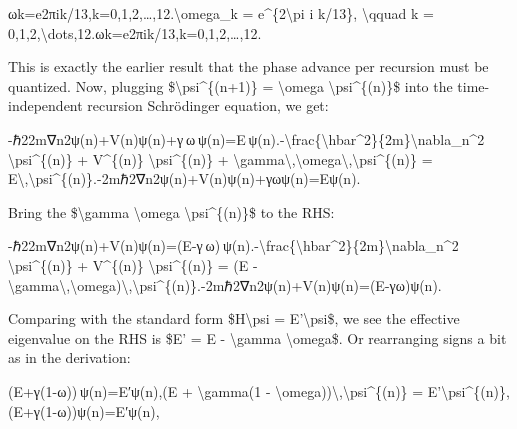 \documentclass[
]{article}
\begin{document}
ωk=e2πik/13,k=0,1,2,\ldots,12.\textbackslash omega\_k =
e\^{}\{2\textbackslash pi i k/13\}, \textbackslash qquad k =
0,1,2,\textbackslash dots,12.ωk\hspace{0pt}=e2πik/13,k=0,1,2,\ldots,12.\hspace{0pt}

This is exactly the earlier result that the phase advance per recursion
must be quantized. Now, plugging \$\textbackslash psi\^{}\{(n+1)\} =
\textbackslash omega \textbackslash psi\^{}\{(n)\}\$ into the
time-independent recursion Schrödinger equation, we get:

-ℏ22m∇n2ψ(n)+V(n)ψ(n)+γ ω ψ(n)=E ψ(n).-\textbackslash frac\{\textbackslash hbar\^{}2\}\{2m\}\textbackslash nabla\_n\^{}2
\textbackslash psi\^{}\{(n)\} + V\^{}\{(n)\}
\textbackslash psi\^{}\{(n)\} +
\textbackslash gamma\textbackslash,\textbackslash omega\textbackslash,\textbackslash psi\^{}\{(n)\}
=
E\textbackslash,\textbackslash psi\^{}\{(n)\}.-2mℏ2\hspace{0pt}∇n2\hspace{0pt}ψ(n)+V(n)ψ(n)+γωψ(n)=Eψ(n).

Bring the \$\textbackslash gamma \textbackslash omega
\textbackslash psi\^{}\{(n)\}\$ to the RHS:

-ℏ22m∇n2ψ(n)+V(n)ψ(n)=(E-γ ω) ψ(n).-\textbackslash frac\{\textbackslash hbar\^{}2\}\{2m\}\textbackslash nabla\_n\^{}2
\textbackslash psi\^{}\{(n)\} + V\^{}\{(n)\}
\textbackslash psi\^{}\{(n)\} = (E -
\textbackslash gamma\textbackslash,\textbackslash omega)\textbackslash,\textbackslash psi\^{}\{(n)\}.-2mℏ2\hspace{0pt}∇n2\hspace{0pt}ψ(n)+V(n)ψ(n)=(E-γω)ψ(n).\hspace{0pt}

Comparing with the standard form \$H\textbackslash psi =
E'\textbackslash psi\$, we see the effective eigenvalue on the RHS is
\$E' = E - \textbackslash gamma \textbackslash omega\$. Or rearranging
signs a bit as in the derivation:

(E+γ(1-ω)) ψ(n)=E′ψ(n),(E + \textbackslash gamma(1 -
\textbackslash omega))\textbackslash,\textbackslash psi\^{}\{(n)\} =
E'\textbackslash psi\^{}\{(n)\},(E+γ(1-ω))ψ(n)=E′ψ(n),
\end{document}
